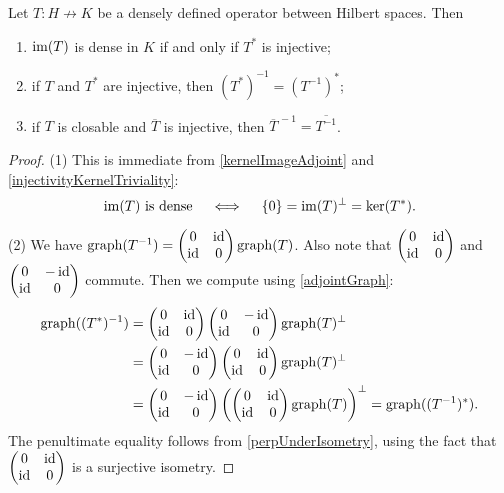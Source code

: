\begin{proposition}
Let $T: H\not\to K$ be a densely defined operator between Hilbert spaces. Then
\begin{enumerate}
\item $\operatorname{im}(T)$ is dense in $K$ \textup{if and only if} $T^*$ is injective;
\item if $T$ and $T^*$ are injective, then $(T^*)^{-1} = (T^{-1})^*$;
\item if $T$ is closable and $\overline{T}$ is injective, then $\overline{T}^{\,-1} = \overline{T^{-1}}$.
\end{enumerate}
\end{proposition}
\begin{proof}
(1) This is immediate from \ref{kernelImageAdjoint} and \ref{injectivityKernelTriviality}:
\[ \text{$\operatorname{im}(T)$ is dense} \quad\iff\quad \{0\} = \operatorname{im}(T)^\perp = \ker(T^*). \]

(2) We have $\operatorname{graph}(T^{-1}) = \begin{pmatrix}
0 & \operatorname{id} \\ \operatorname{id} & 0
\end{pmatrix}\operatorname{graph}(T)$. Also note that $\begin{pmatrix}
0 & \operatorname{id} \\ \operatorname{id} & 0
\end{pmatrix}$ and $\begin{pmatrix}
0 & -\operatorname{id} \\ \operatorname{id} & 0
\end{pmatrix}$ commute. Then we compute using \ref{adjointGraph}:
\begin{align*}
\operatorname{graph}((T^*)^{-1}) &= \begin{pmatrix}
0 & \operatorname{id} \\ \operatorname{id} & 0
\end{pmatrix}\begin{pmatrix}
0 & -\operatorname{id} \\ \operatorname{id} & 0
\end{pmatrix}\operatorname{graph}(T)^\perp \\
&= \begin{pmatrix}
0 & -\operatorname{id} \\ \operatorname{id} & 0
\end{pmatrix}\begin{pmatrix}
0 & \operatorname{id} \\ \operatorname{id} & 0
\end{pmatrix}\operatorname{graph}(T)^\perp \\
&= \begin{pmatrix}
0 & -\operatorname{id} \\ \operatorname{id} & 0
\end{pmatrix}\left(\begin{pmatrix}
0 & \operatorname{id} \\ \operatorname{id} & 0
\end{pmatrix}\operatorname{graph}(T)\right)^\perp = \operatorname{graph}((T^{-1})^*).
\end{align*}
The penultimate equality follows from \ref{perpUnderIsometry}, using the fact that $\begin{pmatrix}
0 & \operatorname{id} \\ \operatorname{id} & 0
\end{pmatrix}$ is a surjective isometry.
\end{proof}

